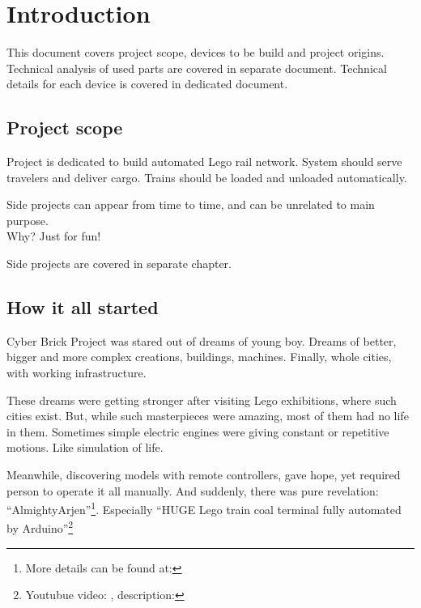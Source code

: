 \section{Introduction}

This document covers project scope, devices to be build and project origins. Technical analysis
of used parts are covered in separate document. Technical details for each device is covered in
dedicated document.


\subsection{Project scope}

Project is dedicated to build automated Lego rail network. System should serve travelers and
deliver cargo. Trains should be loaded and unloaded automatically.

Side projects can appear from time to time, and can be unrelated to main purpose.\\
Why? Just for fun!

Side projects are covered in separate chapter.


\subsection{How it all started}

Cyber Brick Project was stared out of dreams of young boy. Dreams of better, bigger and more
complex creations, buildings, machines. Finally, whole cities, with working infrastructure.

These dreams were getting stronger after visiting Lego exhibitions, where such cities exist. But,
while such masterpieces were amazing, most of them had no life in them. Sometimes simple electric
engines were giving constant or repetitive motions. Like simulation of life.

Meanwhile, discovering models with remote controllers, gave hope, yet required person to
operate it all manually. And suddenly, there was pure revelation: ``AlmightyArjen''\footnote{
More details can be found at: }. Especially ``HUGE Lego train
coal terminal fully automated by Arduino''\footnote{ Youtubue video:
, description: }

